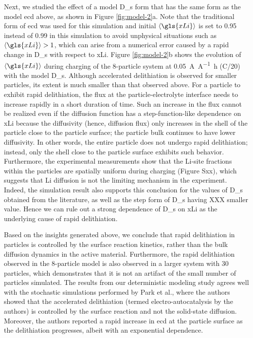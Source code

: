 \documentclass{article}
\begin{document}
Next, we studied the effect of a model \gls{D_s} form that has the
same form as the model \gls{ecd} above, as shown in Figure
\ref{fig:model-2}a. Note that the traditional form of \gls{ecd} was
used for this simulation and initial $\left\langle \gls{xLi}
\right\rangle$ is set to \num{0.95} instead of \num{0.99} in this
simulation to avoid unphysical situations such as $\left\langle
\gls{xLi} \right\rangle > 1$, which can arise from a numerical error
caused by a rapid change in \gls{D_s} with respect to
\gls{xLi}. Figure \ref{fig:model-2}b shows the evolution of
$\left\langle \gls{xLi} \right\rangle$ during charging of the
8-particle system at \SI{0.05}{\ampere\per\ampere\hour} (C/20) with
the model \gls{D_s}. Although accelerated delithiation is observed for
smaller particles, its extent is much smaller than that observed
above. For a particle to exhibit rapid delithiation, the flux at the
particle-electrolyte interface needs to increase rapidly in a short
duration of time. Such an increase in the flux cannot be realized even
if the diffusion function has a step-function-like dependence on
\gls{xLi} because the diffusivity (hence, diffusion flux) only
increases in the shell of the particle close to the particle surface;
the particle bulk continues to have lower diffusivity. In other words,
the entire particle does not undergo rapid delithiation; instead, only
the shell close to the particle surface exhibits such
behavior. Furthermore, the experimental measurements show that the
Li-site fractions within the particles are spatially uniform during
charging (Figure Sxx), which
suggests that Li diffusion is not the limiting mechanism in the
experiment. Indeed, the simulation result also supports this
conclusion for the values of \gls{D_s} obtained from the literature,
as well as the step form of \gls{D_s} having XXX smaller value. Hence we can rule out
a strong dependence of \gls{D_s} on \gls{xLi} as the underlying cause
of rapid delithiation.

Based on the insights generated above, we conclude that rapid
delithiation in \nca{} particles is controlled by the surface reaction
kinetics, rather than the bulk  diffusion dynamics in the
active material. Furthermore, the rapid delithiation
  observed in the 8-particle model is also observed in a larger
system with 30 particles, which demonstrates that it is not an
artifact of the small number of particles simulated. The results from
our deterministic modeling study agrees well with the stochastic
simulations performed by Park et al.\cite{chueh2021}, where the
authors showed that the accelerated delithiation (termed
electro-autocatalysis by the authors) is controlled by the surface
reaction and not the solid-state diffusion. Moreover, the authors
reported a rapid increase in \gls{ecd} at the \nca{} particle surface
as the delithiation progresses, albeit with an exponential dependence. 
\end{document}
